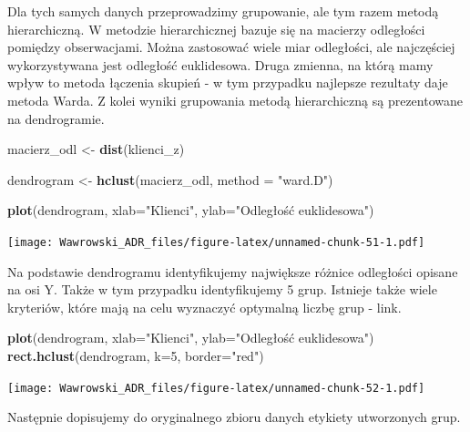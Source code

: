 \documentclass[]{book}
\newenvironment{Shaded}{\begin{snugshade}}{\end{snugshade}}
\newcommand{\DataTypeTok}[1]{\textcolor[rgb]{0.13,0.29,0.53}{#1}}
\newcommand{\DecValTok}[1]{\textcolor[rgb]{0.00,0.00,0.81}{#1}}
\newcommand{\KeywordTok}[1]{\textcolor[rgb]{0.13,0.29,0.53}{\textbf{#1}}}
\newcommand{\NormalTok}[1]{#1}
\newcommand{\OperatorTok}[1]{\textcolor[rgb]{0.81,0.36,0.00}{\textbf{#1}}}
\newcommand{\StringTok}[1]{\textcolor[rgb]{0.31,0.60,0.02}{#1}}
\begin{document}
Dla tych samych danych przeprowadzimy grupowanie, ale tym razem metodą hierarchiczną. W metodzie hierarchicznej bazuje się na macierzy odległości pomiędzy obserwacjami. Można zastosować wiele miar odległości, ale najczęściej wykorzystywana jest odległość euklidesowa. Druga zmienna, na którą mamy wpływ to metoda łączenia skupień - w tym przypadku najlepsze rezultaty daje metoda Warda. Z kolei wyniki grupowania metodą hierarchiczną są prezentowane na dendrogramie.

\begin{Shaded}
\begin{Highlighting}[]
\NormalTok{macierz_odl <-}\StringTok{ }\KeywordTok{dist}\NormalTok{(klienci_z)}

\NormalTok{dendrogram <-}\StringTok{ }\KeywordTok{hclust}\NormalTok{(macierz_odl, }\DataTypeTok{method =} \StringTok{"ward.D"}\NormalTok{)}

\KeywordTok{plot}\NormalTok{(dendrogram, }\DataTypeTok{xlab=}\StringTok{"Klienci"}\NormalTok{, }\DataTypeTok{ylab=}\StringTok{"Odległość euklidesowa"}\NormalTok{)}
\end{Highlighting}
\end{Shaded}

\texttt{[image: Wawrowski\_ADR\_files/figure-latex/unnamed-chunk-51-1.pdf]}

Na podstawie dendrogramu identyfikujemy największe różnice odległości opisane na osi Y. Także w tym przypadku identyfikujemy 5 grup. Istnieje także wiele kryteriów, które mają na celu wyznaczyć optymalną liczbę grup - link.

\begin{Shaded}
\begin{Highlighting}[]
\KeywordTok{plot}\NormalTok{(dendrogram, }\DataTypeTok{xlab=}\StringTok{"Klienci"}\NormalTok{, }\DataTypeTok{ylab=}\StringTok{"Odległość euklidesowa"}\NormalTok{)}
\KeywordTok{rect.hclust}\NormalTok{(dendrogram, }\DataTypeTok{k=}\DecValTok{5}\NormalTok{, }\DataTypeTok{border=}\StringTok{"red"}\NormalTok{)}
\end{Highlighting}
\end{Shaded}

\texttt{[image: Wawrowski\_ADR\_files/figure-latex/unnamed-chunk-52-1.pdf]}

Następnie dopisujemy do oryginalnego zbioru danych etykiety utworzonych grup.

\begin{Shaded}
\end{Shaded}
\end{document}
